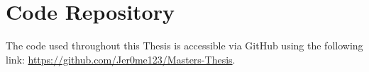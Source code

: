 \chapter{Code Repository}

The code used throughout this Thesis is accessible via GitHub using the following link: \href{https://github.com/Jer0me123/Masters-Thesis}{https://github.com/Jer0me123/Masters-Thesis}.